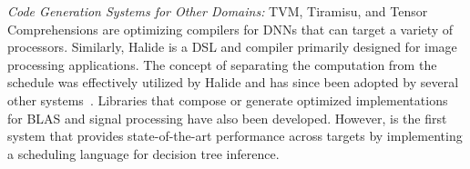 \emph{Code Generation Systems for Other Domains:}
TVM\cite{TVM}, Tiramisu\cite{Tiramisu}, and Tensor 
Comprehensions\cite{TensorComprehensions} are optimizing compilers 
for DNNs that can target a variety of processors. Similarly, 
Halide\cite{Halide} is a DSL and compiler primarily designed for 
image processing applications. The concept of separating the computation 
from the schedule was effectively utilized by Halide and has since been adopted 
by several other systems~\cite{TVM,Tiramisu,GraphIt}. 
Libraries that compose or generate optimized implementations  
for BLAS\cite{BLIS, atlas_sc98, CUTLASS} and signal processing\cite{FFTW, SPIRAL}
have also been developed.
However, \Treebeard{} is the first system that provides state-of-the-art performance
across targets by implementing a scheduling language for decision tree inference.


